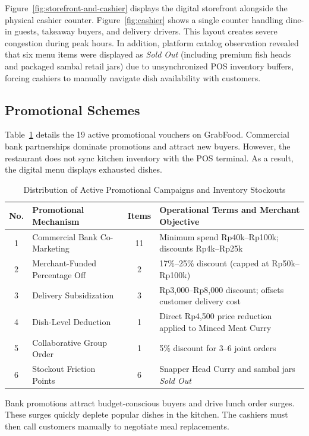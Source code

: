 \documentclass{jomas}
\begin{document}
Figure~\ref{fig:storefront-and-cashier} displays the digital storefront alongside the physical cashier counter. Figure~\ref{fig:cashier} shows a single counter handling dine-in guests, takeaway buyers, and delivery drivers. This layout creates severe congestion during peak hours. In addition, platform catalog observation revealed that six menu items were displayed as \textit{Sold Out} (including premium fish heads and packaged sambal retail jars) due to unsynchronized POS inventory buffers, forcing cashiers to manually navigate dish availability with customers.

\subsection{Promotional Schemes}
Table~\ref{tab:promo-schemes} details the 19 active promotional vouchers on GrabFood. Commercial bank partnerships dominate promotions and attract new buyers. However, the restaurant does not sync kitchen inventory with the POS terminal. As a result, the digital menu displays exhausted dishes.

\begin{table}[H]
\caption{Distribution of Active Promotional Campaigns and Inventory Stockouts}
\label{tab:promo-schemes}
\centering
\small
\begin{tabularx}{\textwidth}{c l c X}
\toprule
\textbf{No.} & \textbf{Promotional Mechanism} & \textbf{Items} & \textbf{Operational Terms and Merchant Objective} \\
\midrule
1 & Commercial Bank Co-Marketing & 11 & Minimum spend Rp40k--Rp100k; discounts Rp4k--Rp25k \\
2 & Merchant-Funded Percentage Off & 2 & 17\%--25\% discount (capped at Rp50k--Rp100k) \\
3 & Delivery Subsidization & 3 & Rp3,000--Rp8,000 discount; offsets customer delivery cost \\
4 & Dish-Level Deduction & 1 & Direct Rp4,500 price reduction applied to Minced Meat Curry \\
5 & Collaborative Group Order & 1 & 5\% discount for 3--6 joint orders \\
6 & Stockout Friction Points & 6 & Snapper Head Curry and sambal jars \textit{Sold Out} \\
\bottomrule
\end{tabularx}
\end{table}

Bank promotions attract budget-conscious buyers and drive lunch order surges. These surges quickly deplete popular dishes in the kitchen. The cashiers must then call customers manually to negotiate meal replacements.
\end{document}
